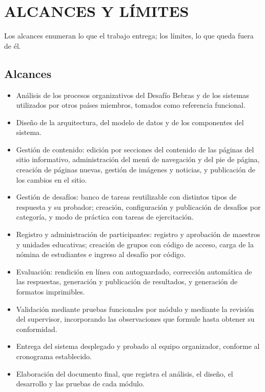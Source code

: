 \section{ALCANCES Y LÍMITES}

Los alcances enumeran lo que el trabajo entrega; los límites, lo que queda fuera de él.

\subsection{Alcances}

\begin{itemize}
    \item Análisis de los procesos organizativos del Desafío Bebras y de los sistemas utilizados por otros países miembros, tomados como referencia funcional.
    \item Diseño de la arquitectura, del modelo de datos y de los componentes del sistema.
    \item Gestión de contenido: edición por secciones del contenido de las páginas del sitio informativo, administración del menú de navegación y del pie de página, creación de páginas nuevas, gestión de imágenes y noticias, y publicación de los cambios en el sitio.
    \item Gestión de desafíos: banco de tareas reutilizable con distintos tipos de respuesta y su probador; creación, configuración y publicación de desafíos por categoría, y modo de práctica con tareas de ejercitación.
    \item Registro y administración de participantes: registro y aprobación de maestros y unidades educativas; creación de grupos con código de acceso, carga de la nómina de estudiantes e ingreso al desafío por código.
    \item Evaluación: rendición en línea con autoguardado, corrección automática de las respuestas, generación y publicación de resultados, y generación de formatos imprimibles.
    \item Validación mediante pruebas funcionales por módulo y mediante la revisión del supervisor, incorporando las observaciones que formule hasta obtener su conformidad.
    \item Entrega del sistema desplegado y probado al equipo organizador, conforme al cronograma establecido.
    \item Elaboración del documento final, que registra el análisis, el diseño, el desarrollo y las pruebas de cada módulo.
\end{itemize}

